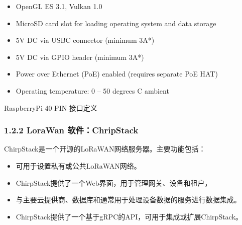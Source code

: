 \documentclass[a4paper,12pt,english]{sphinxmanual}
\begin{document}
\begin{itemize}
\item {} 
\sphinxAtStartPar
OpenGL ES 3.1, Vulkan 1.0

\item {} 
\sphinxAtStartPar
Micro\sphinxhyphen{}SD card slot for loading operating system and data storage

\item {} 
\sphinxAtStartPar
5V DC via USB\sphinxhyphen{}C connector (minimum 3A*)

\item {} 
\sphinxAtStartPar
5V DC via GPIO header (minimum 3A*)

\item {} 
\sphinxAtStartPar
Power over Ethernet (PoE) enabled (requires separate PoE HAT)

\item {} 
\sphinxAtStartPar
Operating temperature: 0 – 50 degrees C ambient

\end{itemize}

\sphinxAtStartPar
{}

\sphinxAtStartPar
{}

\sphinxAtStartPar
RaspberryPi 40 PIN 接口定义

\sphinxAtStartPar
{}


\subsubsection{1.2.2 LoraWan 软件：ChripStack}
\label{\detokenize{dev-board/arch:lorawan-chripstack}}
\sphinxAtStartPar
ChirpStack是一个开源的LoRaWAN网络服务器。主要功能包括：
\begin{itemize}
\item {} 
\sphinxAtStartPar
可用于设置私有或公共LoRaWAN网络。

\item {} 
\sphinxAtStartPar
ChirpStack提供了一个Web界面，用于管理网关、设备和租户，

\item {} 
\sphinxAtStartPar
与主要云提供商、数据库和通常用于处理设备数据的服务进行数据集成。

\item {} 
\sphinxAtStartPar
ChirpStack提供了一个基于gRPC的API，可用于集成或扩展ChirpStack。

\end{itemize}

\sphinxAtStartPar
{}
\end{document}
